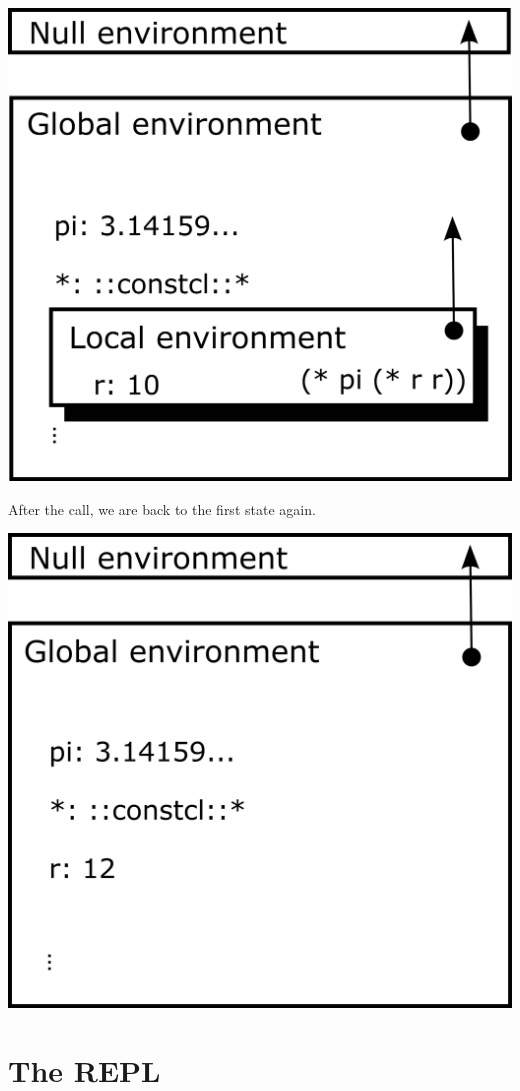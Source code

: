 \documentclass[twoside,9pt]{report}
\begin{document}
\includegraphics{images/env2.png}

After the call, we are back to the first state again.

\includegraphics{images/env1.png}
\chapter{The REPL}
\label{the-repl}
\end{document}
